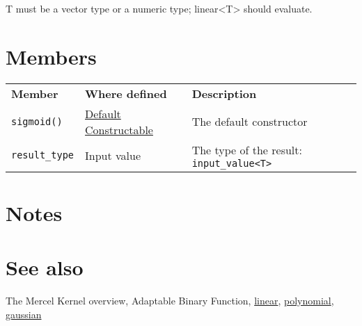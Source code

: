 \documentclass{article}
\begin{document}
T must be a vector type or a numeric type; linear<T> should evaluate.


\section*{Members}

\begin{tabular}{lll}
\textbf{Member} & \textbf{Where defined} & \textbf{Description} \\ 
\texttt{sigmoid()} & \href{http://www.sgi.com/tech/stl/DefaultConstructible.html}{Default Constructable} & The default constructor \\
\texttt{result_type} & Input value & The type of the result: \texttt{input_value<T>} \\
\end{tabular}

\section*{Notes}

\section*{See also}

The Mercel Kernel overview, Adaptable Binary Function,
\href{research/kml/documentation/linear.html}{linear}, 
\href{research/kml/documentation/polynomial.html}{polynomial}, 
\href{research/kml/documentation/gaussian.html}{gaussian}



\end{document}
